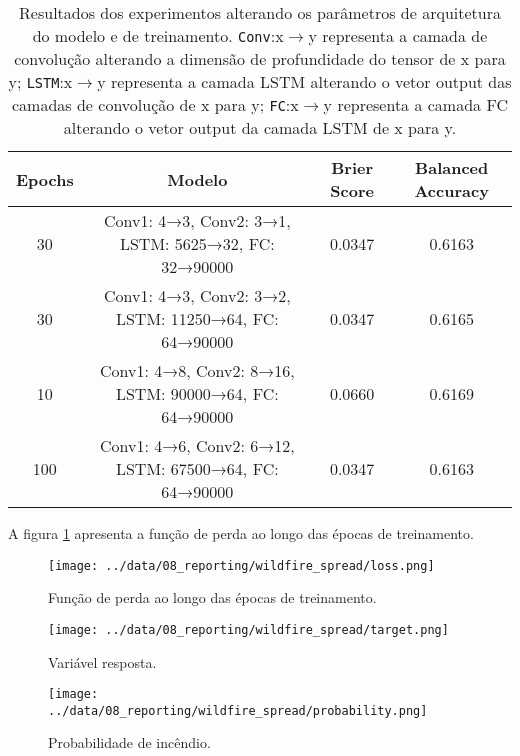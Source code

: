 \documentclass[journal]{IEEEtran}
\begin{document}
\begin{table*}[htbp]
    \begin{center}
    \begin{tabular}{|c|c|c|c|}
    \hline
    \textbf{Epochs} & \textbf{Modelo} & \textbf{Brier Score} & \textbf{Balanced Accuracy} \\
    \hline
    30 & Conv1: 4→3, Conv2: 3→1, LSTM: 5625→32, FC: 32→90000 & 0.0347 & 0.6163 \\
    \hline
    30 & Conv1: 4→3, Conv2: 3→2, LSTM: 11250→64, FC: 64→90000 & 0.0347 & 0.6165 \\
    \hline
    10 & Conv1: 4→8, Conv2: 8→16, LSTM: 90000→64, FC: 64→90000 & 0.0660 & 0.6169 \\
    \hline
    100 & Conv1: 4→6, Conv2: 6→12, LSTM: 67500→64, FC: 64→90000 & 0.0347 & 0.6163 \\
    \hline
    \end{tabular}
    \label{tab1}
    \end{center}
    \caption{Resultados dos experimentos alterando os parâmetros de arquitetura do modelo e de treinamento. \texttt{Conv}:x$\rightarrow$y representa a camada de convolução alterando a dimensão de profundidade do tensor de x para y; \texttt{LSTM}:x$\rightarrow$y representa a camada LSTM alterando o vetor output das camadas de convolução de x para y; \texttt{FC}:x$\rightarrow$y representa a camada FC alterando o vetor output da camada LSTM de x para y.}
\end{table*}

A figura \ref{fig:figura_2} apresenta a função de perda ao longo das épocas de treinamento.

\begin{figure}[h]
    \centering
    \texttt{[image: ../data/08\_reporting/wildfire\_spread/loss.png]}
    \caption{Função de perda ao longo das épocas de treinamento.}
    \label{fig:figura_2}
\end{figure}

\begin{figure}[h]
        \centering
        \texttt{[image: ../data/08\_reporting/wildfire\_spread/target.png]}
        \caption{Variável resposta.}
        \label{fig:target}
\end{figure}

\begin{figure}[h]
        \centering
        \texttt{[image: ../data/08\_reporting/wildfire\_spread/probability.png]}
        \caption{Probabilidade de incêndio.}
        \label{fig:probability}
\end{figure}
\end{document}
